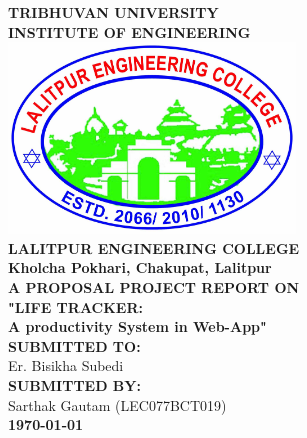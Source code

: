 {
	\thispagestyle{empty}
	\centering
   \fontsize{14pt}{14pt}\selectfont
        	\textbf{\MakeUppercase{Tribhuvan University}}\\
        	\textbf{\MakeUppercase{INSTITUTE OF ENGINEERING}}\\[0.5cm]
        	\includegraphics[width=3in]{lec2.jpg}\\[0.3cm]
        	\textbf{\MakeUppercase{Lalitpur Engineering College}}\\
    	\textbf{Kholcha Pokhari, Chakupat, Lalitpur}\\[1.4cm]
    	
    	\textbf{\MakeUppercase{A proposal project report on}}\\
    	\textbf{"\MakeUppercase{LIFE TRACKER}:  \\ A productivity System in Web-App"}\\[2cm]
    
    	
    	\textbf{\MakeUppercase{Submitted To:}}\\
    	{Er. Bisikha Subedi}\\[1.2cm]
    	\textbf{\MakeUppercase{Submitted By:}}\\
            {
        	{{Sarthak Gautam (LEC077BCT019)}}\\[1.2cm]
            }	
    	\textbf{\today}\\
}

